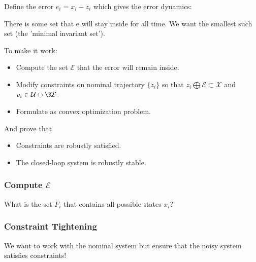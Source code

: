 \documentclass[8pt,a4paper]{scrartcl}
\begin{document}
\begin{multicols*}{3}
\begin{multicols*}{4}
{Define the error $e_i=x_i-z_i$ which gives the error dynamics:


There is some set that e will stay inside for all time. We want the smallest such set (the 'minimal invariant set').


To make it work:

\begin{itemize}

\item Compute the set $\mathcal{E}$ that the error will remain inside.
\item Modify constraints on nominal trajectory $\{z_i\}$ so that $z_i\bigoplus\mathcal{E}\subset\mathcal{X}$ and $v_i\in\mathcal{U}\ominus\K\mathcal{E}$.
\item Formulate as convex optimization problem.
\end{itemize}

And prove that
\begin{itemize}

\item Constraints are robustly satisfied.
\item The closed-loop system is robustly stable.
\end{itemize}
}%

\subsubsection{Compute $\mathcal{E}$}

What is the set $F_i$ that contains all possible states $x_i$?




\subsubsection{Constraint Tightening}

We want to work with the nominal system but ensure that the noisy system satisfies constraints!


\end{multicols*}
\end{multicols*}
\end{document}
